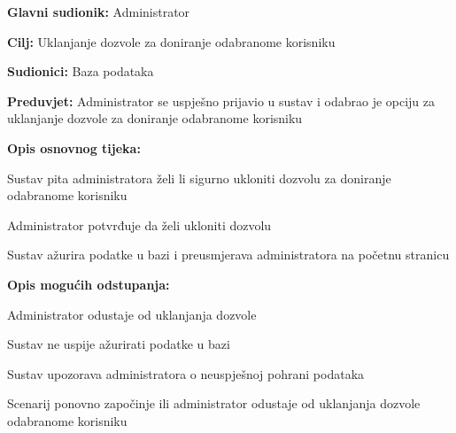 					\noindent {}
					\begin{packed_item}
	
						\item \textbf{Glavni sudionik: }Administrator
						\item  \textbf{Cilj:} Uklanjanje dozvole za doniranje odabranome korisniku
						\item  \textbf{Sudionici:} Baza podataka
						\item  \textbf{Preduvjet:} Administrator se uspješno prijavio u sustav i odabrao je opciju za uklanjanje dozvole za doniranje odabranome korisniku
						\item  \textbf{Opis osnovnog tijeka:}
						
						\item[] \begin{packed_enum}
							\item Sustav pita administratora želi li sigurno ukloniti dozvolu za doniranje odabranome korisniku
							\item Administrator potvrđuje da želi ukloniti dozvolu
							\item Sustav ažurira podatke u bazi i preusmjerava administratora na početnu stranicu
						\end{packed_enum}

						\eject
						\item  \textbf{Opis mogućih odstupanja:}

						\item[] \begin{packed_item}
							\item[2.a] Administrator odustaje od uklanjanja dozvole
							\item[3.a] Sustav ne uspije ažurirati podatke u bazi
							\item[] \begin{packed_enum}
								\item Sustav upozorava administratora o neuspješnoj pohrani podataka
								\item Scenarij ponovno započinje ili administrator odustaje od uklanjanja dozvole odabranome korisniku
							\end{packed_enum}					
						\end{packed_item}
					\end{packed_item}

